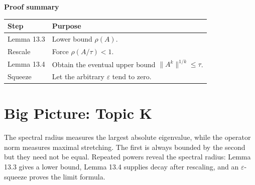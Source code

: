 \documentclass[11pt,a4paper]{article}
\newcommand{\prooftable}[1]{\medskip\textbf{Proof summary}\par\smallskip #1\medskip}
\begin{document}
\prooftable{\begin{tabularx}{\linewidth}{@{}p{.26\linewidth}X@{}}\hline
Step & Purpose\\\hline
Lemma 13.3 & Lower bound \(\rho(A)\).\\
Rescale & Force \(\rho(A/\tau)<1\).\\
Lemma 13.4 & Obtain the eventual upper bound \(\|A^k\|^{1/k}\leq\tau\).\\
Squeeze & Let the arbitrary \(\varepsilon\) tend to zero.\\\hline
\end{tabularx}}

\section*{Big Picture: Topic K}
The spectral radius measures the largest absolute eigenvalue, while the operator norm measures maximal stretching. The first is always bounded by the second but they need not be equal. Repeated powers reveal the spectral radius: Lemma 13.3 gives a lower bound, Lemma 13.4 supplies decay after rescaling, and an \(\varepsilon\)-squeeze proves the limit formula.
\end{document}
